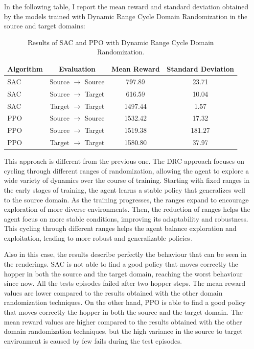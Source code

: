 \documentclass[11pt]{article}
\begin{document}
In the following table, I report the mean reward and standard deviation obtained by the models trained with Dynamic Range Cycle Domain Randomization in the source and target domains:

\begin{table}[H]
    \centering
    \begin{tabular}{|l|c|c|c|}
        \hline
        \textbf{Algorithm} & \textbf{Evaluation} & \textbf{Mean Reward} & \textbf{Standard Deviation} \\ \hline
        SAC & Source $\rightarrow$ Source & 797.89 & 23.71 \\ 
        SAC & Source $\rightarrow$ Target & 616.59 & 10.04 \\ 
        SAC & Target $\rightarrow$ Target & 1497.44 & 1.57 \\ \hline
        PPO & Source $\rightarrow$ Source & 1532.42 & 17.32 \\ 
        PPO & Source $\rightarrow$ Target & 1519.38 & 181.27 \\ 
        PPO & Target $\rightarrow$ Target & 1580.80 & 37.97 \\ \hline
    \end{tabular}
    \caption{Results of SAC and PPO with Dynamic Range Cycle Domain Randomization.}
    \label{tab:results_drc}
\end{table}

This approach is different from the previous one. The DRC approach focuses on cycling through different ranges of randomization, allowing the agent to explore a wide variety of dynamics over the course of training. Starting with fixed ranges in the early stages of training, the agent learns a stable policy that generalizes well to the source domain. As the training progresses, the ranges expand to encourage exploration of more diverse environments. Then, the reduction of ranges helps the agent focus on more stable conditions, improving its adaptability and robustness. This cycling through different ranges helps the agent balance exploration and exploitation, leading to more robust and generalizable policies.

Also in this case, the results describe perfectly the behaviour that can be seen in the renderings. SAC is not able to find a good policy that moves correctly the hopper in both the source and the target domain, reaching the worst behaviour since now. All the tests episodes failed after two hopper steps. The mean reward values are lower compared to the results obtained with the other domain randomization techniques. On the other hand, PPO is able to find a good policy that moves correctly the hopper in both the source and the target domain. The mean reward values are higher compared to the results obtained with the other domain randomization techniques, but the high variance in the source to target environment is caused by few fails during the test episodes.
\end{document}

